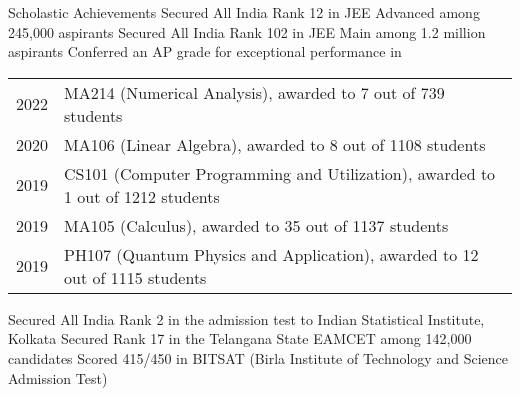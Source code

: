 
\begin{rubric}{Scholastic Achievements}
    \entry*[2019] Secured All India Rank 12 in JEE Advanced among 245,000 aspirants
    \entry*[2019\phantom{}] Secured All India Rank 102 in JEE Main among 1.2 million aspirants
    \entry* Conferred an AP grade for exceptional performance in
        
        \begin{tabular}{@{}ll}
           2022 & MA214 (Numerical Analysis), awarded to 7 out of 739 students \\
           2020 & MA106 (Linear Algebra), awarded to 8 out of 1108 students \\
           2019 & CS101 (Computer Programming and Utilization), awarded to 1 out of 1212 students \\
           2019 & MA105 (Calculus), awarded to 35 out of 1137 students \\
           2019 & PH107 (Quantum Physics and Application), awarded to 12 out of 1115 students \\
        \end{tabular}
    \entry*[2019] Secured All India Rank 2 in the admission test to Indian Statistical Institute, Kolkata
    \entry*[2019\phantom{}] Secured Rank 17 in the Telangana State EAMCET among 142,000 candidates
    \entry*[2019] Scored 415/450 in BITSAT (Birla Institute of Technology and Science Admission Test)
\end{rubric}